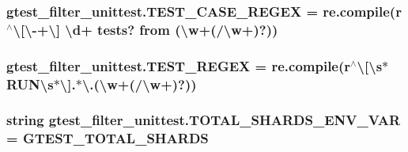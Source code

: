 \subsubsection[{\texorpdfstring{T\+E\+S\+T\+\_\+\+C\+A\+S\+E\+\_\+\+R\+E\+G\+EX}{TEST_CASE_REGEX}}]{\setlength{\rightskip}{0pt plus 5cm}gtest\+\_\+filter\+\_\+unittest.\+T\+E\+S\+T\+\_\+\+C\+A\+S\+E\+\_\+\+R\+E\+G\+EX = re.\+compile(r\textquotesingle{}$^\wedge$\textbackslash{}\mbox{[}\textbackslash{}-\/+\textbackslash{}\mbox{]} \textbackslash{}d+ tests? from (\textbackslash{}w+(/\textbackslash{}w+)?)\textquotesingle{})}\hypertarget{namespacegtest__filter__unittest_a76b555691fb57191f50a4328134fb4d8}{}\label{namespacegtest__filter__unittest_a76b555691fb57191f50a4328134fb4d8}
\subsubsection[{\texorpdfstring{T\+E\+S\+T\+\_\+\+R\+E\+G\+EX}{TEST_REGEX}}]{\setlength{\rightskip}{0pt plus 5cm}gtest\+\_\+filter\+\_\+unittest.\+T\+E\+S\+T\+\_\+\+R\+E\+G\+EX = re.\+compile(r\textquotesingle{}$^\wedge$\textbackslash{}\mbox{[}\textbackslash{}s$\ast$R\+U\+N\textbackslash{}s$\ast$\textbackslash{}\mbox{]}.$\ast$\textbackslash{}.(\textbackslash{}w+(/\textbackslash{}w+)?)\textquotesingle{})}\hypertarget{namespacegtest__filter__unittest_a9327e0f4c9fab06a346228cc5bab53f2}{}\label{namespacegtest__filter__unittest_a9327e0f4c9fab06a346228cc5bab53f2}
\subsubsection[{\texorpdfstring{T\+O\+T\+A\+L\+\_\+\+S\+H\+A\+R\+D\+S\+\_\+\+E\+N\+V\+\_\+\+V\+AR}{TOTAL_SHARDS_ENV_VAR}}]{\setlength{\rightskip}{0pt plus 5cm}string gtest\+\_\+filter\+\_\+unittest.\+T\+O\+T\+A\+L\+\_\+\+S\+H\+A\+R\+D\+S\+\_\+\+E\+N\+V\+\_\+\+V\+AR = \textquotesingle{}G\+T\+E\+S\+T\+\_\+\+T\+O\+T\+A\+L\+\_\+\+S\+H\+A\+R\+DS\textquotesingle{}}\hypertarget{namespacegtest__filter__unittest_a3b9a50b994f774c1cebbc52971708e4e}{}\label{namespacegtest__filter__unittest_a3b9a50b994f774c1cebbc52971708e4e}
